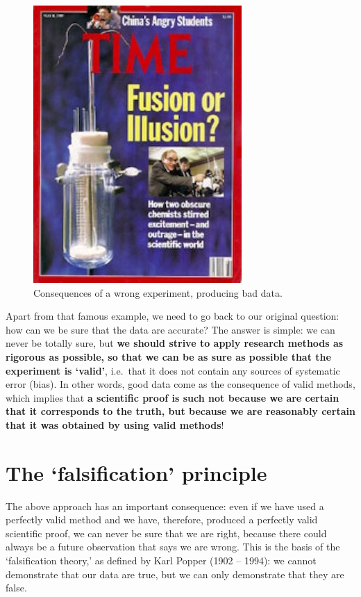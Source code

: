 \documentclass[a4paper,12pt,oneside]{book}
\begin{document}
\begin{figure}

{\centering \includegraphics[width=0.5\linewidth]{_images/FalseResults} 

}

\caption{Consequences of a wrong experiment, producing bad data.}\label{fig:figName2}
\end{figure}

Apart from that famous example, we need to go back to our original question: how can we be sure that the data are accurate? The answer is simple: we can never be totally sure, but \textbf{we should strive to apply research methods as rigorous as possible, so that we can be as sure as possible that the experiment is `valid'}, i.e.~that it does not contain any sources of systematic error (bias). In other words, good data come as the consequence of valid methods, which implies that \textbf{a scientific proof is such not because we are certain that it corresponds to the truth, but because we are reasonably certain that it was obtained by using valid methods}!

\hypertarget{the-falsification-principle}{%
\section{The `falsification' principle}\label{the-falsification-principle}}

The above approach has an important consequence: even if we have used a perfectly valid method and we have, therefore, produced a perfectly valid scientific proof, we can never be sure that we are right, because there could always be a future observation that says we are wrong. This is the basis of the `falsification theory,' as defined by Karl Popper (1902 -- 1994): we cannot demonstrate that our data are true, but we can only demonstrate that they are false.
\end{document}
